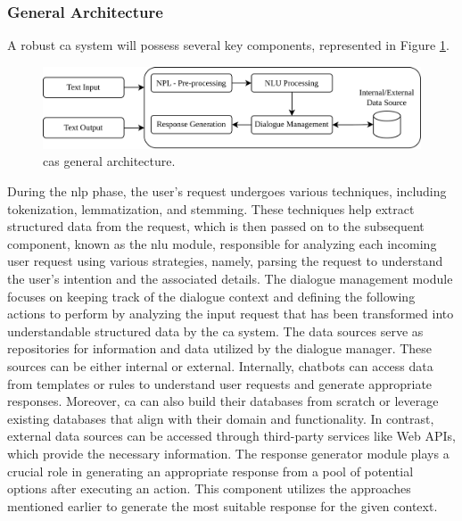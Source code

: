 \documentclass[a4paper,fleqn]{cas-sc}
\begin{document}
\subsubsection{General Architecture}

A robust \gls{ca} system will possess several key components, represented in Figure \ref{fig:ConversationalAgentGeneralArchitecture}.

\begin{figure}[htbp]
	\centering
	\includegraphics[width=\linewidth]{figs/ConversationalAgentGeneralArchitecture.png}
	\caption{\gls{cas} general architecture.}
	\label{fig:ConversationalAgentGeneralArchitecture}
\end{figure}

During the \gls{nlp} phase, the user's request undergoes various techniques, including tokenization, lemmatization, and stemming. These techniques help extract structured data from the request, which is then passed on to the subsequent component, known as the \gls{nlu} module, responsible for analyzing each incoming user request using various strategies, namely, parsing the request to understand the user's intention and the associated details. The dialogue management module focuses on keeping track of the dialogue context and defining the following actions to perform by analyzing the input request that has been transformed into understandable structured data by the \gls{ca} system. The data sources serve as repositories for information and data utilized by the dialogue manager. These sources can be either internal or external. Internally, chatbots can access data from templates or rules to understand user requests and generate appropriate responses. Moreover, \gls{ca} can also build their databases from scratch or leverage existing databases that align with their domain and functionality. In contrast, external data sources can be accessed through third-party services like Web APIs, which provide the necessary information. The response generator module plays a crucial role in generating an appropriate response from a pool of potential options after executing an action. This component utilizes the approaches mentioned earlier to generate the most suitable response for the given context. \cite{rizou_multilingual_2022, mohamad_suhaili_service_2021}
\end{document}
